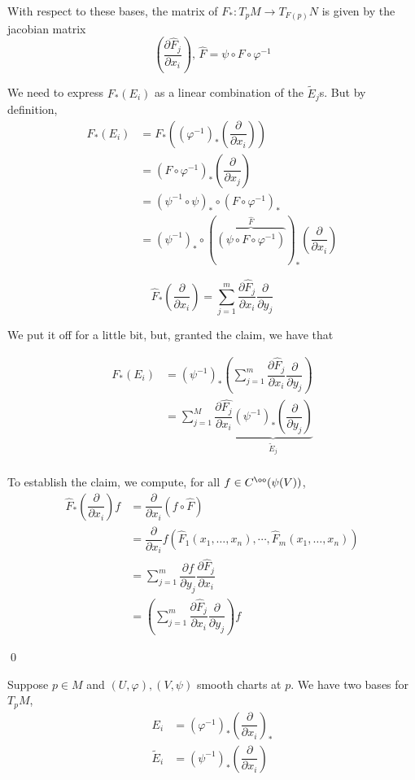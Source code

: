 \documentclass[x11names,reqno,14pt]{extarticle}
\newcommand{\pp}[2]{\dfrac{\partial #1}{\partial #2}}
\renewcommand{\phi}{\varphi}
\begin{document}
\prop

With respect to these bases, the matrix of $F_*:T_pM\to T_{F(p)}N$ is given by the jacobian matrix 
\[
\left(\pp{\hat{F}_j}{x_i}\right),\, \hat{F} = \psi\circ F \circ \phi^{-1}
\]

\proof

We need to express $F_*(E_i)$ as a linear combination of the $\tilde{E}_j$s. But by definition, 
\begin{align*}
F_*(E_i) & = F_*\left((\phi^{-1})_*\left(\pp{}{x_i}\right)\right)\\
			& = (F\circ\phi^{-1})_*\left(\pp{}{x_j}\right) \\
			& = (\psi^{-1}\circ\psi)_*\circ(F\circ\phi^{-1})_* \\
			& = (\psi^{-1})_* \circ (\overbrace{(\psi\circ F \circ \phi^{-1})}^{\hat{F}})_*\left(\pp{}{x_i}\right)
\end{align*}

\claim 

\[
\hat{F}_*\left(\pp{}{x_i}\right) = \sum_{j=1}^m\pp{\hat{F}_j}{x_i}\pp{}{y_j}
\]

\proof

We put it off for a little bit, but, granted the claim, we have that

\begin{align*}
F_*(E_i) & = (\psi^{-1})_*\left(\sum_{j=1}^m\pp{\hat{F}_j}{x_i}\pp{}{y_j}\right) \\
			& = \sum_{j=1}^M \pp{\hat{F_j}}{x_i} \underbrace{(\psi^{-1})_*\left(\pp{}{y_j}\right)}_{\tilde{E}_j} \\
\end{align*}

To establish the claim, we compute, for all $f \in C^\oo(\psi(V))$, 
\begin{align*}
\hat{F}_*\left(\pp{}{x_i}\right) f & = \pp{}{x_i}(f\circ\hat{F}) \\
									& = \pp{}{x_i}f(\hat{F}_1(x_1,\dots,x_n),\cdots,\hat{F}_m(x_1,\dots,x_n)) \\
									& = \sum_{j=1}^m\pp{f}{y_j}\pp{\hat{F}_j}{x_i} \\
									& = \left(\sum_{j=1}^m\pp{\hat{F}_j}{x_i}\pp{}{y_j}\right)f
\end{align*}

\qed

\cor

Suppose $p \in M$ and $(U, \phi), (V,\psi)$ smooth charts at $p$. We have two bases for $T_pM$, 
\begin{align*}
E_i & = (\phi^{-1})_*\left(\pp{}{x_i}\right)_* \\
\tilde{E}_i & = (\psi^{-1})_*\left(\pp{}{x_i}\right) \\
\end{align*}
\end{document}
